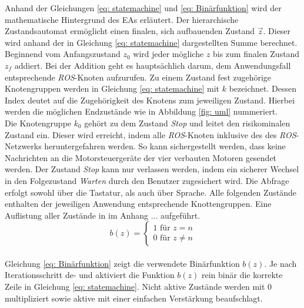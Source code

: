 		Anhand der Gleichungen \ref{eq: statemachine} und \ref{eq: Binärfunktion} wird der mathematische Hintergrund des EAs erläutert. Der hierarchische Zustandsautomat ermöglicht einen finalen, sich aufbauenden Zustand $\vec{z}$. Dieser wird anhand der in Gleichung \ref{eq: statemachine} dargestellten Summe berechnet. Beginnend vom Anfangszustand $z_0$ wird jeder mögliche $z$ bis zum finalen Zustand $z_f$ addiert. Bei der Addition geht es hauptsächlich darum, dem Anwendungsfall entsprechende \textit{ROS}-Knoten aufzurufen. Zu einem Zustand fest zugehörige Knotengruppen werden in Gleichung \ref{eq: statemachine} mit $k$ bezeichnet. Dessen Index deutet auf die Zugehörigkeit des Knotens zum jeweiligen Zustand. Hierbei werden die möglichen Endzustände wie in Abbildung \ref{fig: uml} nummeriert.\\
		
		Die Knotengruppe $k_0$ gehört zu dem Zustand \textit{Stop} und leitet den risikominalen Zustand ein. Dieser wird erreicht, indem alle \textit{ROS}-Knoten inklusive des des \textit{ROS}-Netzwerks heruntergefahren werden. So kann sichergestellt werden, dass keine Nachrichten an die Motorsteuergeräte der vier verbauten Motoren gesendet werden. Der Zustand \textit{Stop} kann nur verlassen werden, indem ein sicherer Wechsel in den Folgezustand \textit{Warten} durch den Benutzer zugesichert wird. Die Abfrage erfolgt sowohl über die Tastatur, als auch über Sprache. Alle folgenden Zustände enthalten der jeweiligen Anwendung entsprechende Knottengruppen. Eine Auflistung aller Zustände in im Anhang ... aufgeführt.\\ 
	
	\begin{equation}
	b(z)=\left\{\begin{array}{ll} 1 \text{ für } z=n \\
	0 \text{ für }z\neq n\end{array}\right. 
	\label{eq: Binärfunktion}
	\end{equation}\\
		
		Gleichung \ref{eq: Binärfunktion} zeigt die verwendete Binärfunktion $b(z)$. Je nach Iterationsschritt de- und aktiviert die Funktion $b(z)$ rein binär die korrekte Zeile in Gleichung \ref{eq: statemachine}. Nicht aktive Zustände werden mit 0 multipliziert sowie aktive mit einer einfachen Verstärkung beaufschlagt. \\
		
